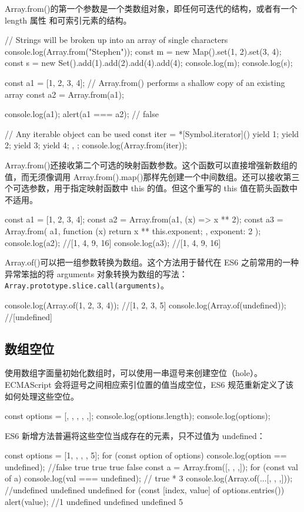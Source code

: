 Array.from()的第一个参数是一个类数组对象，即任何可迭代的结构，或者有一个 length 属性
和可索引元素的结构。
\begin{js}
// Strings will be broken up into an array of single characters
console.log(Array.from("Stephen"));
const m = new Map().set(1, 2).set(3, 4);
const s = new Set().add(1).add(2).add(4).add(4);
console.log(m);
console.log(s);

const a1 = [1, 2, 3, 4];
// Array.from() performs a shallow copy of an existing array
const a2 = Array.from(a1);

console.log(a1);
alert(a1 === a2); // false

// Any iterable object can be used
const iter = {
*[Symbol.iterator]() {
        yield 1;
        yield 2;
        yield 3;
        yield 4;
    },
};
console.log(Array.from(iter));
\end{js}

Array.from()还接收第二个可选的映射函数参数。这个函数可以直接增强新数组的值，而无须像调用 Array.from().map()那样先创建一个中间数组。还可以接收第三个可选参数，用于指定映射函数中 this 的值。但这个重写的 this 值在箭头函数中不适用。

\begin{js}
const a1 = [1, 2, 3, 4];
const a2 = Array.from(a1, (x) => x ** 2);
const a3 = Array.from(
a1,
function (x) {
        return x ** this.exponent;
    },
{ exponent: 2 }
);
console.log(a2); //[1, 4, 9, 16]
console.log(a3); //[1, 4, 9, 16]
\end{js}

Array.of()可以把一组参数转换为数组。这个方法用于替代在 ES6 之前常用的一种异常笨拙的将 arguments 对象转换为数组的写法： \verb|Array.prototype.slice.call(arguments)|。
\begin{js}
console.log(Array.of(1, 2, 3, 4)); //[1, 2, 3, 5]
console.log(Array.of(undefined)); //[undefined]
\end{js}
\subsection{数组空位}
使用数组字面量初始化数组时，可以使用一串逗号来创建空位（hole）。ECMAScript 会将逗号之间相应索引位置的值当成空位，ES6 规范重新定义了该如何处理这些空位。
\begin{js}
const options = [, , , , ,];
console.log(options.length);
console.log(options);
\end{js}
ES6 新增方法普遍将这些空位当成存在的元素，只不过值为 undefined：\
\begin{js}
const options = [1, , , , 5];
for (const option of options) {
        console.log(option == undefined); //false true true true false
    }
const a = Array.from([, , ,]);
for (const val of a) {
        console.log(val === undefined); // true * 3
    }
console.log(Array.of(...[, , ,])); //undefined undefined undefined
for (const [index, value] of options.entries()) {
        alert(value); //1 undefined undefined undefined 5
    }
\end{js}

